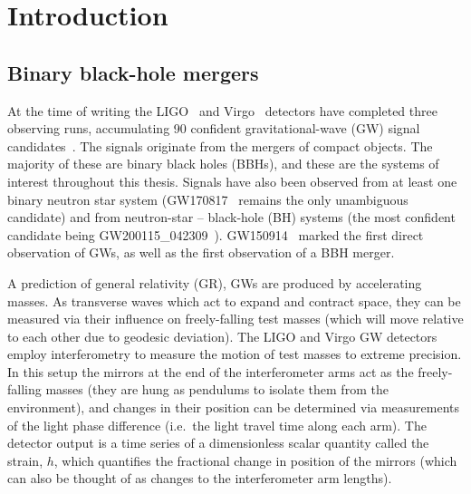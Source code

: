 
\chapter{Introduction}
\label{Chapter1}

\section{Binary black-hole mergers}
\label{ch1:sec:bbh_mergers}

At the time of writing the 
LIGO~\cite{LIGOScientific:2014pky} and Virgo~\cite{VIRGO:2014yos} detectors have completed three observing runs, accumulating 90 confident gravitational-wave (GW) signal candidates~\cite{LIGOScientific:2018mvr, LIGOScientific:2020ibl, LIGOScientific:2021usb, LIGOScientific:2021djp}.
The signals originate from the mergers of compact objects. 
The majority of these are binary black holes (BBHs), and these are the systems of interest throughout this thesis.  
Signals have also been observed from at least one binary neutron star system (GW170817~\cite{LIGOScientific:2017vwq} remains the only unambiguous candidate) and from neutron-star -- black-hole (BH) systems (the most confident candidate being GW200115\_042309~\cite{LIGOScientific:2021qlt}).
GW150914~\cite{LIGOScientific:2016aoc} marked the first direct observation of GWs, as well as the first observation of a BBH merger.

A prediction of general relativity (GR), GWs are produced by accelerating masses.
As transverse waves which act to expand and contract space, they can be measured via their influence on freely-falling test masses (which will move relative to each other due to geodesic deviation).
The LIGO and Virgo GW detectors employ interferometry to measure the motion of test masses to extreme precision. 
In this setup the mirrors at the end of the interferometer arms act as the freely-falling masses (they are hung as pendulums to isolate them from the environment), and changes in their position can be determined via measurements of the light phase difference (i.e.\ the light travel time along each arm).
The detector output is a time series of a dimensionless scalar quantity called the strain, $h$, which quantifies the fractional change in position of the mirrors (which can also be thought of as changes to the interferometer arm lengths).

